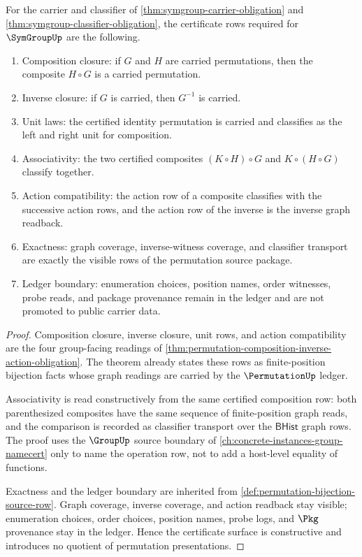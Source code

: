 \begin{theorem}
\label{thm:symgroup-composition-inverse-action-obligations}
For the carrier and classifier of \autoref{thm:symgroup-carrier-obligation}
and \autoref{thm:symgroup-classifier-obligation}, the certificate rows required
for $\SymGroupUp$ are the following.
\begin{enumerate}
\item Composition closure: if $G$ and $H$ are carried permutations, then the
composite $H\circ G$ is a carried permutation.
\item Inverse closure: if $G$ is carried, then $G^{-1}$ is carried.
\item Unit laws: the certified identity permutation is carried and classifies
as the left and right unit for composition.
\item Associativity: the two certified composites $(K\circ H)\circ G$ and
$K\circ(H\circ G)$ classify together.
\item Action compatibility: the action row of a composite classifies with the
successive action rows, and the action row of the inverse is the inverse graph
readback.
\item Exactness: graph coverage, inverse-witness coverage, and classifier
transport are exactly the visible rows of the permutation source package.
\item Ledger boundary: enumeration choices, position names, order witnesses,
probe reads, and package provenance remain in the ledger and are not promoted
to public carrier data.
\end{enumerate}
\end{theorem}
\begin{proof}
Composition closure, inverse closure, unit rows, and action compatibility are
the four group-facing readings of
\autoref{thm:permutation-composition-inverse-action-obligation}. The theorem
already states these rows as finite-position bijection facts whose graph
readings are carried by the $\PermutationUp$ ledger.

Associativity is read constructively from the same certified composition row:
both parenthesized composites have the same sequence of finite-position graph
reads, and the comparison is recorded as classifier transport over the
$\mathsf{BHist}$ graph rows. The proof uses the $\GroupUp$ source boundary of
\autoref{ch:concrete-instances-group-namecert} only to name the operation row,
not to add a host-level equality of functions.

Exactness and the ledger boundary are inherited from
\autoref{def:permutation-bijection-source-row}. Graph coverage, inverse
coverage, and action readback stay visible; enumeration choices, order choices,
position names, probe logs, and $\Pkg$ provenance stay in the ledger. Hence the
certificate surface is constructive and introduces no quotient of permutation
presentations.
\end{proof}

